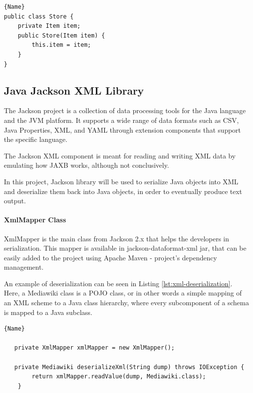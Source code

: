 \documentclass[thesis=M,english,hidelinks]{FITthesis}[2019/12/23]
\begin{document}
\begin{lstlisting}[caption=Example class with a Dependency Injection,frame=tlrb,  label = {lst:with-dep-injection}]{Name}
public class Store {
	private Item item;
	public Store(Item item) {
		this.item = item;
	}
}
\end{lstlisting}

\subsection{Java Jackson XML Library}

The Jackson project is a collection of data processing tools for the Java language and the \gls{JVM} platform. It supports a wide range of data formats such as \gls{CSV}, Java Properties, XML, and \gls{YAML} through extension components that support the specific language.

The Jackson XML component is meant for reading and writing XML data by emulating how \gls{JAXB} works, although not conclusively.

In this project, Jackson library will be used to serialize Java objects into XML and deserialize them back into Java objects, in order to eventually produce text output.

\paragraph{XmlMapper Class} 

XmlMapper is the main class from Jackson 2.x that helps the developers  in serialization. This mapper is available in jackson-dataformat-xml jar, that can be easily added to the project using Apache Maven - project's dependency management\cite{maven_project}.

An example of deserialization can be seen in Listing \ref{lst:xml-deserialization}. Here, a Mediawiki class is a \gls{POJO} class, or in other words a simple mapping of an XML scheme to a Java class hierarchy, where every subcomponent of a schema is mapped to a Java subclass.

\begin{lstlisting}[caption=Example of an XML Deserialization,frame=tlrb,  label = {lst:xml-deserialization}]{Name}
   
   private XmlMapper xmlMapper = new XmlMapper();
   
   private Mediawiki deserializeXml(String dump) throws IOException {
		return xmlMapper.readValue(dump, Mediawiki.class);
	}

\end{lstlisting}
\end{document}
